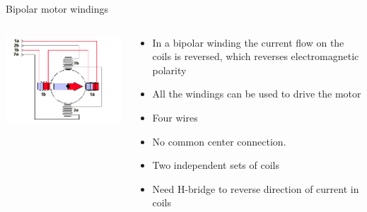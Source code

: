 \documentclass[compress]{beamer}
\begin{document}
\begin{frame}{Bipolar motor windings}

    \begin{columns}
        \begin{column}{0.5\linewidth}

            \begin{center}
                \includegraphics[width=\linewidth]{bipolar}
            \end{center}
        \end{column}
        \begin{column}{0.5\linewidth}

            \begin{itemize}
                \item In a bipolar winding the current flow on the coils is reversed, which reverses electromagnetic polarity
                \item All the windings can be used to drive the motor
                \item Four wires 
                \item No common center connection. 
                \item Two independent sets of coils
                \item Need H-bridge to reverse direction of current in coils
            \end{itemize}
        \end{column}
    \end{columns}

\end{frame}
\end{document}
